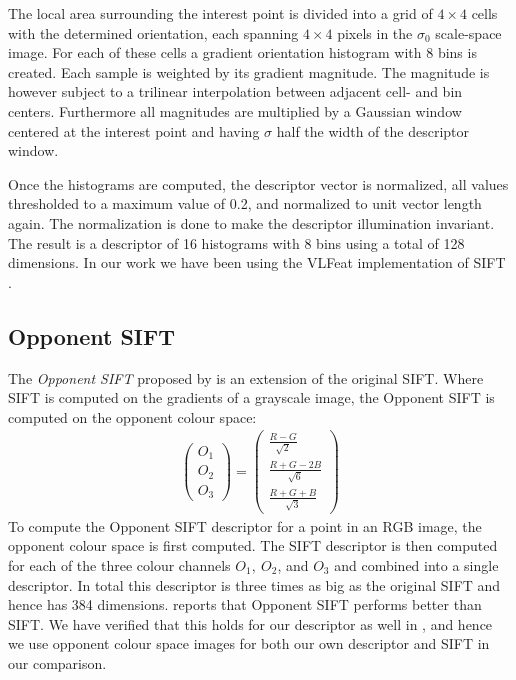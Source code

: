 \documentclass[thesis.tex]{subfiles}
\begin{document}
The local area surrounding the interest point is divided into a grid of $4 \times 4$ cells with the determined orientation, each spanning $4 \times 4$ pixels in the $\sigma_0$ scale-space image. For each of these cells a gradient orientation histogram with 8 bins is created. Each sample is weighted by its gradient magnitude. The magnitude is however subject to a trilinear interpolation between adjacent cell- and bin centers. Furthermore all magnitudes are multiplied by a Gaussian window centered at the interest point and having $\sigma$ half the width of the descriptor window.

Once the histograms are computed, the descriptor vector is normalized, all values thresholded to a maximum value of 0.2, and normalized to unit vector length again. The normalization is done to make the descriptor illumination invariant.
The result is a descriptor of 16 histograms with 8 bins using a total of 128 dimensions. In our work we have been using the VLFeat implementation of SIFT \cite{vedaldi2008vlfeat}.

\subsection{Opponent SIFT}
\label{sec:opponentColourSpace}

The \emph{Opponent SIFT} proposed by \citet{van2010evaluating} is an extension of the original SIFT. Where SIFT is computed on the gradients of a grayscale image, the Opponent SIFT is computed on the opponent colour space:
\begin{align*}
	\begin{pmatrix} O_1 \\ O_2 \\ O_3 \end{pmatrix} =
		\begin{pmatrix}
			\frac{R-G}{\sqrt{2}} \\
			\frac{R+G-2B}{\sqrt{6}} \\
			\frac{R+G+B}{\sqrt{3}}
		\end{pmatrix}
\end{align*}
To compute the Opponent SIFT descriptor for a point in an RGB image, the opponent colour space is first computed. The SIFT descriptor is then computed for each of the three colour channels $O_1,~O_2$, and $O_3$ and combined into a single descriptor. In total this descriptor is three times as big as the original SIFT and hence has 384 dimensions. \citet{van2010evaluating} reports that Opponent SIFT performs better than SIFT. We have verified that this holds for our descriptor as well in , and hence we use opponent colour space images for both our own descriptor and SIFT in our comparison.
\end{document}
